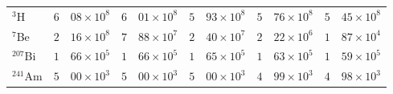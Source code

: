 \documentclass[12pt, a4paper,twoside]{article}
\begin{document}
\begin{table}
\begin{tabular}{l r @{.} l r @{.} l r @{.} l r @{.} l r @{.} l}
         $^{3}$H      &   $6$&$08\times 10^{8 }$ &  $6$&$01\times 10^{8}$ &   $5$&$93\times 10^{8}$ &   $5$&$76\times 10^{8}$&   $5$&$45\times 10^{8}$ \\                                                                                                                                   
         $^{7}$Be     &   $2$&$16\times 10^{8 }$ &  $7$&$88\times 10^{7}$ &   $2$&$40\times 10^{7}$ &   $2$&$22\times 10^{6}$&   $1$&$87\times 10^{4}$ \\                                                                                                                                   
         $^{207}$Bi   &   $1$&$66\times 10^{5 }$ &  $1$&$66\times 10^{5}$ &   $1$&$65\times 10^{5}$ &   $1$&$63\times 10^{5}$&   $1$&$59\times 10^{5}$ \\                                                                                                                                   
         $^{241}$Am   &   $5$&$00\times 10^{3 }$ &  $5$&$00\times 10^{3}$ &   $5$&$00\times 10^{3}$ &   $4$&$99\times 10^{3}$&   $4$&$98\times 10^{3}$ \\
         \bottomrule
      \end{tabular}
\end{table}          
\end{document}
